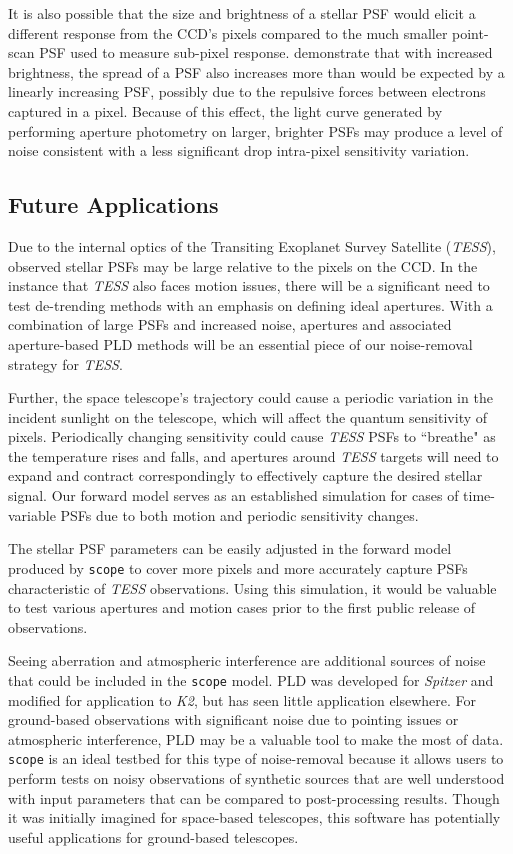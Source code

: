 \documentclass[12pt,preprint]{aastex}
\begin{document}
It is also possible that the size and brightness of a stellar PSF would elicit a different response from the CCD's pixels compared to the much smaller point-scan PSF used to measure sub-pixel response. \cite{1748-0221-9-03-C03048} demonstrate that with increased brightness, the spread of a PSF also increases more than would be expected by a linearly increasing PSF, possibly due to the repulsive forces between electrons captured in a pixel. Because of this effect, the light curve generated by performing aperture photometry on larger, brighter PSFs may produce a level of noise consistent with a less significant drop intra-pixel sensitivity variation.

\subsection{Future Applications}

Due to the internal optics of the Transiting Exoplanet Survey Satellite (\textit{TESS}), observed stellar PSFs may be large relative to the pixels on the CCD. In the instance that \textit{TESS} also faces motion issues, there will be a significant need to test de-trending methods with an emphasis on defining ideal apertures. With a combination of large PSFs and increased noise, apertures and associated aperture-based PLD methods will be an essential piece of our noise-removal strategy for \textit{TESS}.

Further, the space telescope's trajectory could cause a periodic variation in the incident sunlight on the telescope, which will affect the quantum sensitivity of pixels. Periodically changing sensitivity could cause \textit{TESS} PSFs to ``breathe" as the temperature rises and falls, and apertures around \textit{TESS} targets will need to expand and contract correspondingly to effectively capture the desired stellar signal. Our forward model serves as an established simulation for cases of time-variable PSFs due to both motion and periodic sensitivity changes.

The stellar PSF parameters can be easily adjusted in the forward model produced by \texttt{scope} to cover more pixels and more accurately capture PSFs characteristic of \textit{TESS} observations. Using this simulation, it would be valuable to test various apertures and motion cases prior to the first public release of observations.

Seeing aberration and atmospheric interference are additional sources of noise that could be included in the \texttt{scope} model. PLD was developed for \textit{Spitzer} and modified for application to \textit{K2}, but has seen little application elsewhere. For ground-based observations with significant noise due to pointing issues or atmospheric interference, PLD may be a valuable tool to make the most of data. \texttt{scope} is an ideal testbed for this type of noise-removal because it allows users to perform tests on noisy observations of synthetic sources that are well understood with input parameters that can be compared to post-processing results. Though it was initially imagined for space-based telescopes, this software has potentially useful applications for ground-based telescopes.
\end{document}
